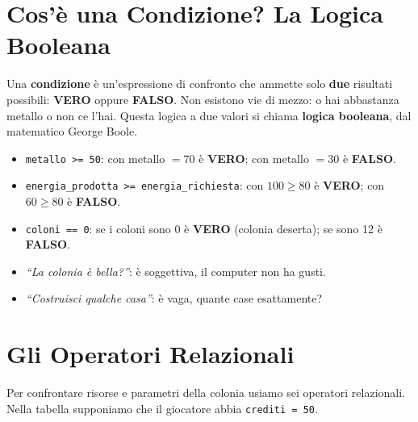 \section{Cos'è una Condizione? La Logica Booleana}

Una \textbf{condizione} è un'espressione di confronto che ammette solo \textbf{due} risultati possibili: \textbf{VERO} oppure \textbf{FALSO}. Non esistono vie di mezzo: o hai abbastanza metallo o non ce l'hai. Questa logica a due valori si chiama \textbf{logica booleana}, dal matematico George Boole.

\begin{esempio}
\begin{itemize}
  \item \texttt{metallo >= 50}: con metallo $= 70$ è \textbf{VERO}; con metallo $= 30$ è \textbf{FALSO}.
  \item \texttt{energia\_prodotta >= energia\_richiesta}: con $100 \geq 80$ è \textbf{VERO}; con $60 \geq 80$ è \textbf{FALSO}.
  \item \texttt{coloni == 0}: se i coloni sono 0 è \textbf{VERO} (colonia deserta); se sono 12 è \textbf{FALSO}.
\end{itemize}
\end{esempio}

\begin{attenzione}
\begin{itemize}
  \item \emph{``La colonia è bella?''}: è soggettiva, il computer non ha gusti.
  \item \emph{``Costruisci qualche casa''}: è vaga, quante case esattamente?
\end{itemize}
\end{attenzione}

\section{Gli Operatori Relazionali}

Per confrontare risorse e parametri della colonia usiamo sei operatori relazionali. Nella tabella supponiamo che il giocatore abbia \texttt{crediti = 50}.

